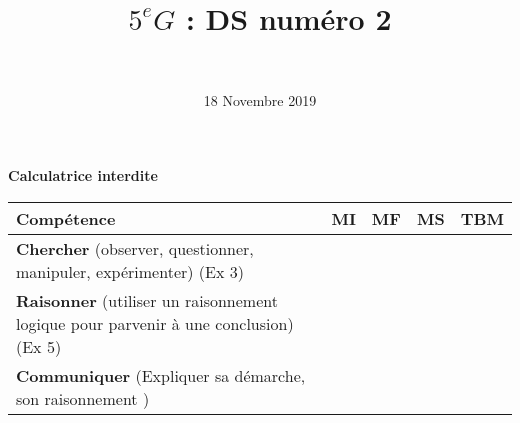 \documentclass[a4paper,11pt]{exam}
\author{\ }
\date{18 Novembre 2019}
\title{$5^e G$ : DS num\'ero 2}
\begin{document}
%	

	\maketitle
	
\begin{center}
	\textbf{Calculatrice interdite}
\end{center}

%
\begin{small}
	\begin{center}
		\begin{tabular}{|@{\ }l@{\ }|@{\ }c@{\ }|@{\ }c@{\ }|@{\ }c@{\ }|@{\ }c@{\ }|}
			\hline
			\textbf{Compétence} & \textbf{MI} & \textbf{MF} & \textbf{MS} & \textbf{TBM} \\
			\hline
			\textbf{Chercher} (observer, questionner, manipuler, expérimenter) (Ex 3)&  \ \ & \ \ & \ \ & \ \  \\
			\hline	
			\textbf{Raisonner} (utiliser un raisonnement logique pour parvenir à une conclusion) (Ex 5)& \ \ & \ \ &  \ \  & \ \ \\
			\hline
			\textbf{Communiquer} (Expliquer sa démarche, son raisonnement ) &  \ \ & \ \ & \ \ & \ \  \\
			\hline
		\end{tabular}
	\end{center}
\end{small}	

	
	
	











\label{LastPage}
\end{document}
